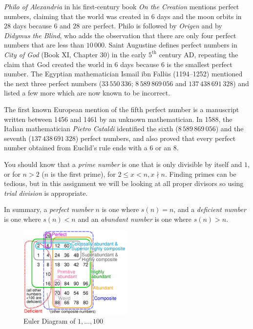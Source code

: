 \emph{Philo of Alexandria}
in his first-century book \emph{On the Creation} mentions perfect numbers,
claiming that the world was created in $6$ days and the moon orbits
in $28$ days because $6$ and $28$ are perfect. Philo is followed by
\emph{Origen}
and by \emph{Didymus the Blind},  who adds the
observation that there are only four perfect numbers that are less
than $10\,000$.
Saint Augustine defines perfect
numbers in \emph{City of God} (Book XI, Chapter 30)
in the early $5^\text{th}$ century AD, repeating the claim that God created
the world in $6$ days because $6$ is the smallest perfect number.
The
Egyptian mathematician Ismail ibn Fall\={u}s (1194--1252) mentioned the
next three perfect numbers ($33\,550\,336$; $8\,589\,869\,056$ and
$137\,438\,691\,328$) and listed a few more which are now known to be
incorrect.

The first known European
mention of the fifth perfect number is a manuscript written between
1456 and 1461 by an unknown mathematician.
In 1588, the Italian mathematician \emph{Pietro Cataldi} identified
the sixth ($8\,589\,869\,056$) and the seventh ($137\,438\,691\,328$) perfect
numbers, and also proved that every perfect number obtained from
Euclid's rule ends with a $6$ or an $8$.

You should know that a \emph{prime number} is one that is only divisible by itself and $1$, or for $n>2$ ($n$ is the first prime), for $2\le x < n, x \nmid n$. Finding primes can be tedious, but in this assignment we will be looking at all proper divisors so using \emph{trial division} is appropriate.

In summary, a \emph{perfect number} $n$ is one where $s(n) = n$,
and a \emph{deficient number} is one where $s(n) < n$ and an
\emph{abundant number} is one where $s(n) > n$.


\begin{figure}
        \centering
\includegraphics[width=0.5\textwidth]{images/euler-diagram.png}
        \caption{Euler Diagram of $1, \ldots, 100$}\label{fig:euler}
\end{figure}

